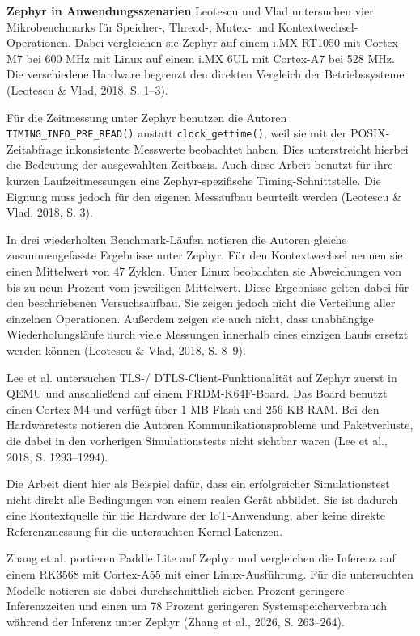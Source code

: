 \textbf{Zephyr in Anwendungsszenarien }Leotescu und Vlad untersuchen vier Mikrobenchmarks für Speicher-, Thread-, Mutex- und Kontextwechsel-Operationen. Dabei vergleichen sie Zephyr auf einem i.MX RT1050 mit Cortex-M7 bei 600 MHz mit Linux auf einem i.MX 6UL mit Cortex-A7 bei 528 MHz. Die verschiedene Hardware begrenzt den direkten Vergleich der Betriebssysteme (Leotescu \& Vlad, 2018, S. 1–3).

Für die Zeitmessung unter Zephyr benutzen die Autoren \lstinline[style=fileinline]|TIMING_INFO_PRE_READ()| anstatt \lstinline[style=fileinline]|clock_gettime()|, weil sie mit der POSIX-Zeitabfrage inkonsistente Messwerte beobachtet haben. Dies unterstreicht hierbei die Bedeutung der ausgewählten Zeitbasis. Auch diese Arbeit benutzt für ihre kurzen Laufzeitmessungen eine Zephyr-spezifische Timing-Schnittstelle. Die Eignung muss jedoch für den eigenen Messaufbau beurteilt werden (Leotescu \& Vlad, 2018, S. 3).

In drei wiederholten Benchmark-Läufen notieren die Autoren gleiche zusammengefasste Ergebnisse unter Zephyr. Für den Kontextwechsel nennen sie einen Mittelwert von 47 Zyklen. Unter Linux beobachten sie Abweichungen von bis zu neun Prozent vom jeweiligen Mittelwert. Diese Ergebnisse gelten dabei für den beschriebenen Versuchsaufbau. Sie zeigen jedoch nicht die Verteilung aller einzelnen Operationen. Außerdem zeigen sie auch nicht, dass unabhängige Wiederholungsläufe durch viele Messungen innerhalb eines einzigen Laufs ersetzt werden können (Leotescu \& Vlad, 2018, S. 8–9).

Lee et al. untersuchen TLS-/ DTLS-Client-Funktionalität auf Zephyr zuerst in QEMU und anschließend auf einem FRDM-K64F-Board. Das Board benutzt einen Cortex-M4 und verfügt über 1 MB Flash und 256 KB RAM. Bei den Hardwaretests notieren die Autoren Kommunikationsprobleme und Paketverluste, die dabei in den vorherigen Simulationstests nicht sichtbar waren (Lee et al., 2018, S. 1293–1294).

Die Arbeit dient hier als Beispiel dafür, dass ein erfolgreicher Simulationstest nicht direkt alle Bedingungen von einem realen Gerät abbildet. Sie ist dadurch eine Kontextquelle für die Hardware der IoT-Anwendung, aber keine direkte Referenzmessung für die untersuchten Kernel-Latenzen.

Zhang et al. portieren Paddle Lite auf Zephyr und vergleichen die Inferenz auf einem RK3568 mit Cortex-A55 mit einer Linux-Ausführung. Für die untersuchten Modelle notieren sie dabei durchschnittlich sieben Prozent geringere Inferenzzeiten und einen um 78 Prozent geringeren Systemspeicherverbrauch während der Inferenz unter Zephyr (Zhang et al., 2026, S. 263–264).

